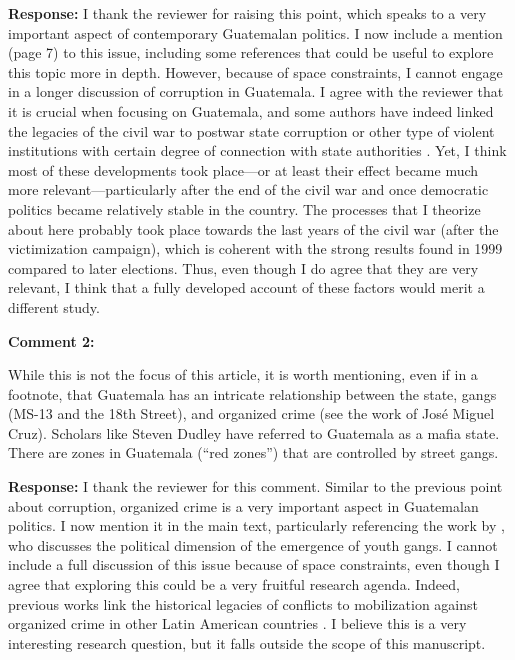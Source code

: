 \documentclass[12pt, a4paper, notitlepage]{article}
\begin{document}
\noindent\textbf{Response:} I thank the reviewer for raising this point, which speaks to a very important aspect of contemporary Guatemalan politics. I now include a mention (page 7) to this issue, including some references that could be useful to explore this topic more in depth. However, because of space constraints, I cannot engage in a longer discussion of corruption in Guatemala. I agree with the reviewer that it is crucial when focusing on Guatemala, and some authors have indeed linked the legacies of the civil war to postwar state corruption \citep{Peacock:2003tt} or other type of violent institutions with certain degree of connection with state authorities \citep{Bateson:2013aa}. Yet, I think most of these developments took place---or at least their effect became much more relevant---particularly after the end of the civil war and once democratic politics became relatively stable in the country.
The processes that I theorize about here probably took place towards the last years of the civil war (after the victimization campaign), which is coherent with the strong results found in 1999 compared to later elections.
Thus, even though I do agree that they are very relevant, I think that a fully developed account of these factors would merit a different study.

\vspace{15pt}
\noindent\textbf{Comment 2:}
\begin{displayquote}
While this is not the focus of this article, it is worth mentioning, even if in a footnote, that Guatemala has an intricate relationship between the state, gangs (MS-13 and the 18th Street), and organized crime (see the work of José Miguel Cruz). Scholars like Steven Dudley have referred to Guatemala as a mafia state. There are zones in Guatemala (“red zones”) that are controlled by street gangs.
\end{displayquote}

\noindent\textbf{Response:} I thank the reviewer for this comment. Similar to the previous point about corruption, organized crime is a very important aspect in Guatemalan politics. I now mention it in the main text, particularly referencing the work by \citet{Levenson:2013tm}, who discusses the political dimension of the emergence of youth gangs. I cannot include a full discussion of this issue because of space constraints, even though I agree that exploring this could be a very fruitful research agenda. Indeed, previous works link the historical legacies of conflicts to mobilization against organized crime in other Latin American countries \citep{Osorio:2021aa}. I believe this is a very interesting research question, but it falls outside the scope of this manuscript.
\end{document}
